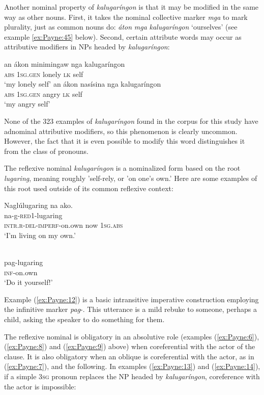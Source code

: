\documentclass[output=paper]{langscibook}
\begin{document}
Another nominal property of \textit{kalugaríngon} is that it may be modified in the same way as other nouns. First, it takes the nominal collective marker \textit{mga} to mark plurality, just as common nouns do: \textit{áton} \textit{mga} \textit{kalugaríngon} `ourselves' (see example \ref{ex:Payne:45} below). Second, certain attribute words may occur as attributive modifiers in NPs headed by \textit{kalugaríngon}:

\ea \label{ex:Payne:10}
\ea 
\gll an ákon minimingaw nga kalugaríngon\\
 \textsc{abs} 1\textsc{sg.gen} lonely \textsc{lk} self\\
 \glt `my lonely self'
\ex 
\gll an ákon nasísina nga kalugaríngon\\
\textsc{abs} 1\textsc{sg.gen} angry \textsc{lk} self\\
\glt `my angry self'
\z
\z

None of the 323 examples of \textit{kalugaríngon} found in the corpus for this study have adnominal attributive modifiers, so this phenomenon is clearly uncommon. However, the fact that it is even possible to modify this word distinguishes it from the class of pronouns.

The reflexive nominal \textit{kalugaríngon} is a nominalized form based on the root \textit{lugaring}, meaning roughly 'self-rely, or 'on one's own.' Here are some examples of this root used outside of its common reflexive context:

\ea \label{ex:Payne:11}
\glll Naglúlugaring na ako.\\
na-g-\textsc{red}1-lugaring\\
\textsc{intr.r}-\textsc{del-imperf}-on.own now 1\textsc{sg.abs}\\
\glt ‘I'm living on my own.'
\z

\ea
\label{ex:Payne:12}
\\
pag-lugaring\\
\textsc{inf}-on.own\\
\glt ‘Do it yourself!' 
\z

Example (\ref{ex:Payne:12}) is a basic intransitive imperative construction employing the infinitive marker \textit{pag}\nobreakdash-. This utterance is a mild rebuke to someone, perhaps a child, asking the speaker to do something for them. 

The reflexive nominal is obligatory in an absolutive role (examples (\ref{ex:Payne:6}), (\ref{ex:Payne:8}) and (\ref{ex:Payne:9}) above) when coreferential with the actor of the clause. It is also obligatory when an oblique is coreferential with the actor, as in (\ref{ex:Payne:7}), and the following. In examples (\ref{ex:Payne:13}) and (\ref{ex:Payne:14}), if a simple 3\textsc{sg} pronoun replaces the NP headed by \textit{kalugaríngon}, coreference with the actor is impossible:
\end{document}
